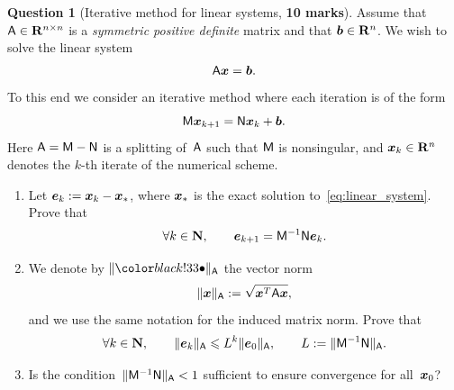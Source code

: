 \documentclass[10pt]{article}
\theoremstyle{definition}
\newtheorem{question}{Question}
\theoremstyle{remark}
\theoremstyle{plain}%
\begin{document}
\newpage
\begin{question}
    [Iterative method for linear systems, \textbf{10 marks}]
    Assume that $\mathsf A \in \mathbf R^{n \times n}$ is a \emph{symmetric positive definite} matrix and that $\mathbf{\boldsymbol{b}} \in \mathbf R^n$.
    We wish to solve the linear system
    \begin{equation}
        \label{eq:linear_system}
        \mathsf A \mathbf{\boldsymbol{x}} = \mathbf{\boldsymbol{b}}.
    \end{equation}
    To this end we consider an iterative method where each iteration is of the form
    \begin{equation}
        \label{eq:iterative_scheme}
        \mathsf M \mathbf{\boldsymbol{x}}_{k+1} = \mathsf N \mathbf{\boldsymbol{x}}_k + \mathbf{\boldsymbol{b}}.
    \end{equation}
    Here $\mathsf A = \mathsf M - \mathsf N$ is a splitting of~$\mathsf A$ such that $\mathsf M$ is nonsingular,
    and $\mathbf{\boldsymbol{x}}_k \in \mathbf R^n$ denotes the $k$-th iterate of the numerical scheme.

    \begin{enumerate}
        \itemsep0pt
        \item
            Let $\mathbf{\boldsymbol{e}}_k := \mathbf{\boldsymbol{x}}_k - \mathbf{\boldsymbol{x}}_*$,
            where $\mathbf{\boldsymbol{x}}_*$ is the exact solution to~\eqref{eq:linear_system}.
            Prove that
            \[
                \forall k \in \mathbf N, \qquad
                \mathbf{\boldsymbol{e}}_{k+1} = \mathsf M^{-1} \mathsf N \mathbf{\boldsymbol{e}}_k.
            \]

        \item
            We denote by $\norm{\placeholder}_{\mat A}$ the vector norm
            \begin{equation}
                \lVert\mathbf{\boldsymbol{x}}\rVert_{\mathsf A} := \sqrt{\mathbf{\boldsymbol{x}}^T \mathsf A \mathbf{\boldsymbol{x}}},
            \end{equation}
            and we use the same notation for the induced matrix norm.
            Prove that
            \begin{equation}
                \label{eq:inequality_interpolation}
                \forall k \in \mathbf N, \qquad
                \lVert\mathbf{\boldsymbol{e}}_k\rVert_{\mathsf A} \leqslant L^k \lVert\mathbf{\boldsymbol{e}}_0\rVert_{\mathsf A},
                \qquad L := \lVert\mathsf M^{-1} \mathsf N\rVert_{\mathsf A}.
            \end{equation}

        \item
            \mymark
            Is the condition~$\lVert\mathsf M^{-1} \mathsf N\rVert_{\mathsf A} < 1$ sufficient to ensure convergence for all~$\mathbf{\boldsymbol{x}}_0$?


\end{enumerate}
\end{question}
\end{document}
